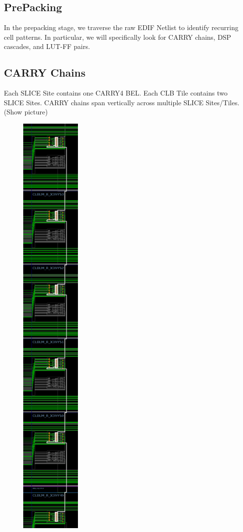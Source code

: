\documentclass[twocolumn]{article}
\begin{document}
    \subsection{PrePacking}
        In the prepacking stage, we traverse the raw EDIF Netlist to identify recurring cell patterns. In particular, we will specifically look for CARRY chains, DSP cascades, and LUT-FF pairs.
        \subsection{CARRY Chains}
            Each SLICE Site contains one CARRY4 BEL.
            Each CLB Tile contains two SLICE Sites.
            CARRY chains span vertically across multiple SLICE Sites/Tiles. (Show picture)
            \begin{figure}
                \centering
                \includegraphics[width=3.0cm]{figures/carry_chain_routes.png}

\end{figure}
\end{document}
